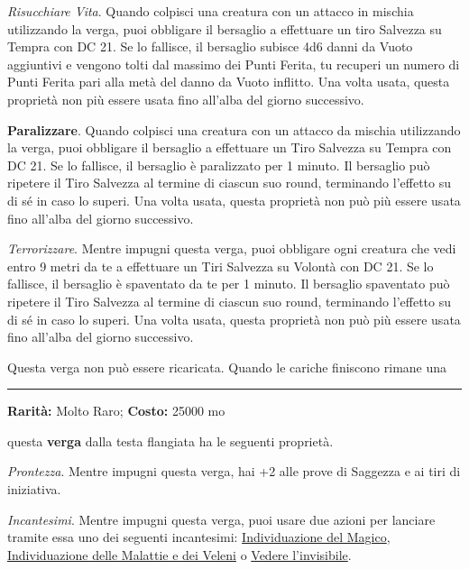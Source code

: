 \begin{multicols}{2}
\emph{Risucchiare Vita}. Quando colpisci una creatura con un attacco in mischia utilizzando la verga, puoi obbligare il bersaglio a effettuare un tiro Salvezza su Tempra con DC 21. Se lo fallisce, il bersaglio subisce 4d6 danni da Vuoto aggiuntivi e vengono tolti dal massimo dei Punti Ferita, tu recuperi un numero di Punti Ferita pari alla metà del danno da Vuoto inflitto. Una volta usata, questa proprietà non più essere usata fino all'alba del giorno successivo.

\textbf{Paralizzare}. Quando colpisci una creatura con un attacco da mischia utilizzando la verga, puoi obbligare il bersaglio a effettuare un Tiro Salvezza su Tempra con DC 21. Se lo fallisce, il bersaglio è paralizzato per 1 minuto. Il bersaglio può ripetere il Tiro Salvezza al termine di ciascun suo round, terminando l'effetto su di sé in caso lo superi. Una volta usata, questa proprietà non può più essere usata fino all'alba del giorno successivo.

\emph{Terrorizzare}. Mentre impugni questa verga, puoi obbligare ogni creatura che vedi entro 9 metri da te a effettuare un Tiri Salvezza su Volontà con DC 21. Se lo fallisce, il bersaglio è spaventato da te per 1 minuto. Il bersaglio spaventato può ripetere il Tiro Salvezza al termine di ciascun suo round, terminando l'effetto su di sé in caso lo superi. Una volta usata, questa proprietà non può più essere usata fino all'alba del giorno successivo.

Questa verga non può essere ricaricata. Quando le cariche finiscono rimane una

\smallskip\noindent\rule{\linewidth}{2pt}  \hypertarget{VergadellaProntezza}{}\smallskip{}\noindent\label{VergadellaProntezza}

\textbf{Rarità:} Molto Raro; \textbf{Costo:} 25000 mo

questa \textbf{verga} dalla testa flangiata ha le seguenti proprietà.

\emph{Prontezza}. Mentre impugni questa verga, hai +2 alle prove di Saggezza e ai tiri di iniziativa.

\emph{Incantesimi}. Mentre impugni questa verga, puoi usare due azioni per lanciare tramite essa uno dei seguenti incantesimi: \hyperlink{Bacchettadell'IndividuazionedelMagico}{Individuazione del Magico}, \hyperlink{Individuazione delle Malattie e dei Veleni}{Individuazione delle Malattie e dei Veleni} o \hyperlink{Vedere l'invisibile}{Vedere l'invisibile}.


\end{multicols}
